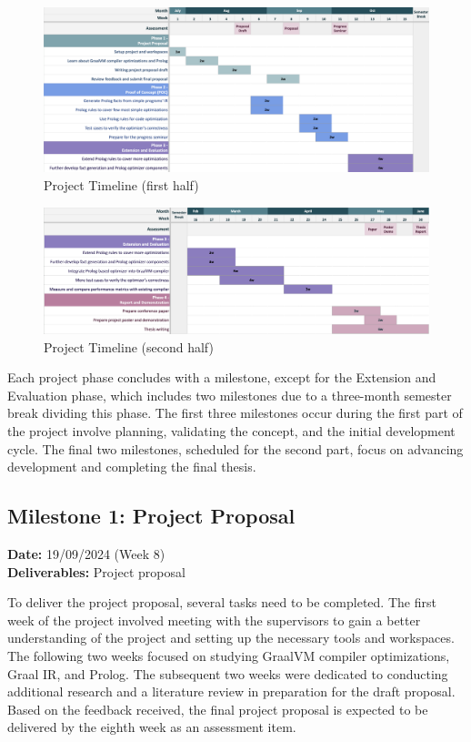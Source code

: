 \begin{figure}[h]
    \includegraphics[width=1\textwidth]{Packages/PartA.png}
    \caption{Project Timeline (first half)}
\end{figure}
\begin{figure}[h]
    \includegraphics[width=1\textwidth]{Packages/PartB.png}
    \caption{Project Timeline (second half)}
\end{figure}

\newpage
Each project phase concludes with a milestone, except for the Extension and Evaluation phase, which includes two milestones due to a three-month semester break dividing this phase. The first three milestones occur during the first part of the project involve planning, validating the concept, and the initial development cycle. The final two milestones, scheduled for the second part, focus on advancing development and completing the final thesis.

\subsection{Milestone 1: Project Proposal}
\textbf{Date:} 19/09/2024 (Week 8) \\
\textbf{Deliverables:} Project proposal

To deliver the project proposal, several tasks need to be completed. The first week of the project involved meeting with the supervisors to gain a better understanding of the project and setting up the necessary tools and workspaces. The following two weeks focused on studying GraalVM compiler optimizations, Graal IR, and Prolog. The subsequent two weeks were dedicated to conducting additional research and a literature review in preparation for the draft proposal. Based on the feedback received, the final project proposal is expected to be delivered by the eighth week as an assessment item.

